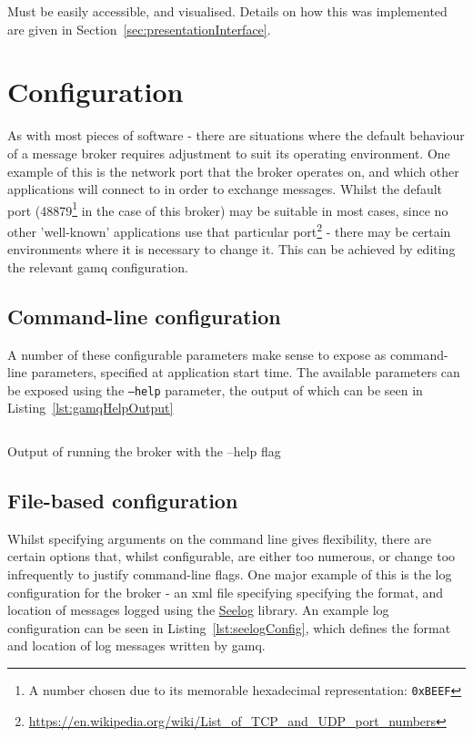 Must be easily accessible, and visualised. Details on how this was implemented
are given in Section~\ref{sec:presentationInterface}.

\section{Configuration}
\label{sec:Configuration}

As with most pieces of software - there are situations where the default
behaviour of a message broker requires adjustment to suit its operating
environment. One example of this is the network port that the broker operates
on, and which other applications will connect to in order to exchange messages.
Whilst the default port (48879\footnote{A number chosen due to its memorable
hexadecimal representation: \texttt{0xBEEF}} in the case of this broker) may be
suitable in most cases, since no other 'well-known' applications use that
particular
port\footnote{\url{https://en.wikipedia.org/wiki/List_of_TCP_and_UDP_port_numbers}} -
there may be certain environments where it is necessary to change it. This can
be achieved by editing the relevant gamq configuration.

\subsection{Command-line configuration}
\label{sub:Command-line configuration}

A number of these configurable parameters make sense to expose as command-line
parameters, specified at application start time. The available parameters can be
exposed using the \texttt{--help} parameter, the output of which can be seen in
Listing~\ref{lst:gamqHelpOutput}

\begin{listing}[ht]
  \centering
  \inputminted{bash}{code/gamqHelpOutput}
  \caption{Output of running the broker with the --help flag}
  \label{lst:gamqHelpOutput}
\end{listing}

\subsection{File-based configuration}
\label{sub:File-based configuration}

Whilst specifying arguments on the command line gives flexibility, there are
certain options that, whilst configurable, are either too numerous, or change
too infrequently to justify command-line flags. One major example of this is the
log configuration for the broker - an \gls{xml} file specifying specifying the
format, and location of messages logged using the
\href{https://github.com/cihub/seelog}{Seelog} library. An example log
configuration can be seen in Listing~\ref{lst:seelogConfig}, which defines the
format and location of log messages written by gamq.

